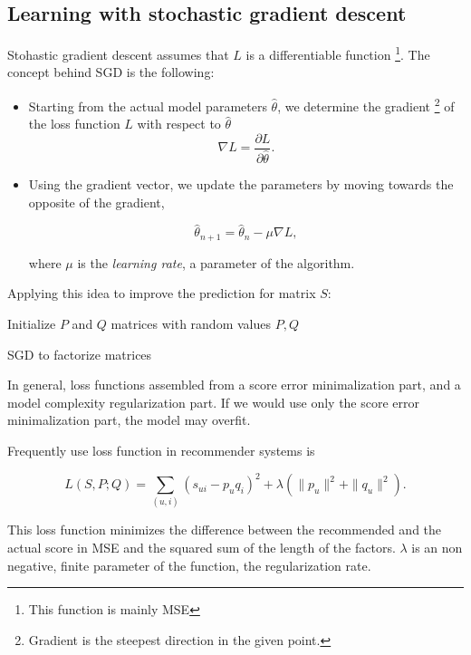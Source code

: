 \subsection{Learning with stochastic gradient descent}
Stohastic gradient descent assumes that $L$ is a differentiable function \footnote{
This function is mainly MSE}. The concept behind SGD is the following:
\begin{itemize}
\item Starting from the actual model parameters $\hat{\theta}$, we determine the 
gradient \footnote{Gradient is the steepest direction in the given point.} of 
the loss function $L$ with respect to $\hat{\theta}$
\[\nabla L = \frac{\partial L}{\partial \hat{\theta}}.\]

\item Using the gradient vector, we update the parameters by moving towards the 
opposite of the gradient,

\[ \hat{\theta}_{n+1}=\hat{\theta}_n - \mu \nabla L ,\]

where $\mu$ is the \emph{learning rate}, a parameter of the algorithm. 
\end{itemize}

Applying this idea to improve the prediction for matrix $S$:

\begin{algorithm}[H]
    Initialize $P$ and $Q$ matrices with random values\;
  \Return $P,Q$
  \caption{SGD to factorize matrices}
\end{algorithm}


In general, loss functions assembled from a score error minimalization part, and 
a model complexity regularization part. If we would use only the score error 
minimalization part, the model may overfit.

Frequently use loss function in recommender systems is 

 \[ L(S,P;Q)=\sum_{(u,i)}(s_{ui}-p_u q_i)^2 + \lambda (\|p_u\|^2+\|q_u\|^2). \]

This loss function minimizes the difference between the recommended and the actual score in MSE 
and the squared sum of the length of the factors. $\lambda$ is an non negative, finite
parameter of the function, the regularization rate. 

